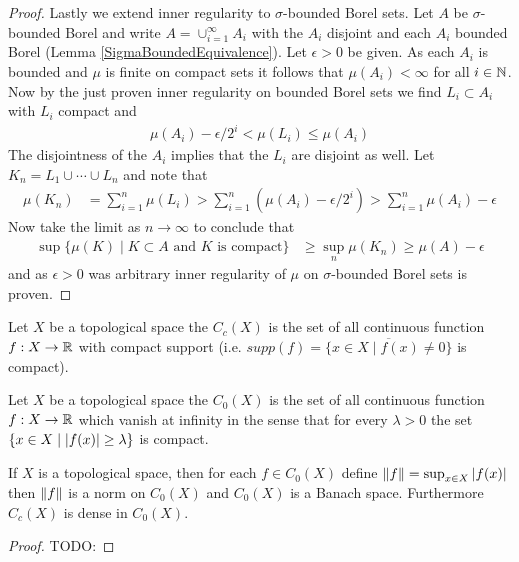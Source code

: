 \begin{proof}
Lastly we extend inner regularity to
$\sigma$-bounded Borel sets.  Let $A$ be $\sigma$-bounded Borel and
write $A = \cup_{i=1}^\infty A_i$ with the $A_i$ disjoint and each
$A_i$ bounded Borel (Lemma \ref{SigmaBoundedEquivalence}).  Let
$\epsilon > 0$ be given.  As each
$A_i$ is bounded and $\mu$ is finite on compact sets it follows that
$\mu(A_i) < \infty$ for all $i \in \mathbb{N}$.  Now by the just proven
inner regularity on bounded Borel sets we find $L_i \subset A_i$ with
$L_i$ compact and
\begin{align*}
\mu(A_i) - \epsilon/2^i < \mu(L_i) \leq \mu(A_i)
\end{align*}
The disjointness of the $A_i$ implies that the $L_i$ are disjoint as well.
Let $K_n = L_1 \cup \dotsb \cup L_n$ and note that
\begin{align*}
\mu(K_n) &= \sum_{i=1}^n \mu(L_i) > \sum_{i=1}^n \left( \mu(A_i) -
\epsilon/2^i \right ) > \sum_{i=1}^n \mu(A_i) - \epsilon
\end{align*}
Now take the limit as $n \to \infty$ to conclude that 
\begin{align*}
\sup \lbrace \mu(K) \mid K \subset A \text{ and $K$ is compact}
\rbrace &\geq \sup_n \mu(K_n) \geq \mu(A) - \epsilon
\end{align*}
and as $\epsilon > 0$ was arbitrary inner regularity of $\mu$ on
$\sigma$-bounded Borel sets is proven.
\end{proof}

\begin{defn}Let $X$ be a topological space the $C_c(X)$ is the set of
  all continuous function $f : X \to \mathbb{R}$ with compact support
  (i.e. $supp(f) = \overline{\{x \in X \mid f(x) \neq 0 \}}$ is
  compact).
\end{defn}

\begin{defn}Let $X$ be a topological space the $C_0(X)$ is the set of
  all continuous function $f : X \to \mathbb{R}$ which vanish at infinity
  in the sense that for every $\lambda >0$ the set $\{ x \in X \mid
  \left \vert f(x) \right \vert \geq \lambda \}$ is  compact.
\end{defn}

\begin{prop}\label{BanachSpaceOfFunctionsVanishingAtInfinity}If $X$ is a topological space, then  for each $f \in C_0(X)$
  define $\lVert f \rVert = \sup_{x \in X} \left \vert f(x) \right \vert$ then $\lVert f \rVert$ is a
  norm on $C_0(X)$ and $C_0(X)$ is a Banach space.  Furthermore
  $C_c(X)$ is dense in $C_0(X)$.
\end{prop}
\begin{proof}
TODO:
\end{proof}

